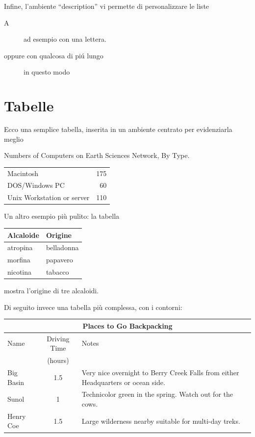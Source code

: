 \documentclass[a4paper,11pt]{article}
\begin{document}
\noindent Infine, l'ambiente ``description'' vi permette di personalizzare le liste
\begin{description}
    \item[A] ad esempio con una lettera.
    \item[oppure con qualcosa di pi\'u lungo] in questo modo
\end{description}

\section{Tabelle}


Ecco una semplice tabella, inserita in un ambiente centrato per evidenziarla meglio

\begin{center}
Numbers of Computers on Earth Sciences Network, By Type.

\begin{tabular}{lr}
Macintosh   &   175 \\
DOS/Windows PC  &   60  \\
Unix Workstation or server  &   110 \\
\end{tabular}
\end{center}



Un altro esempio più pulito: la tabella
\begin{center}
\begin{tabular}{ll}
\toprule
Alcaloide & Origine \\
\midrule
atropina  & belladonna \\
morfina   & papavero \\
nicotina  & tabacco \\
\bottomrule
\end{tabular}
\end{center}
mostra l’origine di tre alcaloidi.


Di seguito invece una tabella più complessa, con i contorni:
\begin{center}
\begin{tabular}{|l|c|p{3.5in}|}
\hline
\multicolumn{3}{|c|}{Places to Go Backpacking}\\ \hline
Name&Driving Time&Notes\\
&(hours)&\\ 
\hline
Big Basin&1.5&Very nice overnight to Berry Creek Falls from
either Headquarters or ocean side.\\ 
\hline
Sunol&1&Technicolor green in the spring. Watch out for the cows.\\ \hline
Henry Coe&1.5&Large wilderness nearby suitable for multi-day treks.\\ \hline
\end{tabular}
\end{center}
\end{document}
